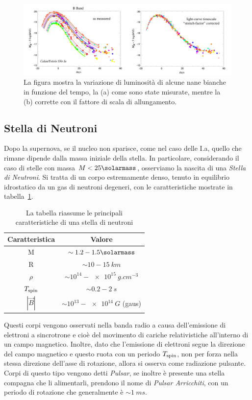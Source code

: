 \begin{figure}
    \centering
    \includegraphics[width = \textwidth]{immagini/stretch_hammuy.png}
    \caption{La figura mostra la variazione di luminosità di alcune nane bianche in funzione del tempo, la (a) come sono state misurate, mentre la (b) corrette con il fattore di scala di allungamento.}\label{fig:std-candle}
\end{figure}

\subsection{Stella di Neutroni}\label{sec:stella-neutroni}
Dopo la supernova, se il nucleo non sparisce, come nel caso delle I.a, quello che rimane dipende dalla massa iniziale della stella. In particolare, considerando il caso di stelle con massa $M < 25\si{\solarmass}$, osserviamo la nascita di una \textit{Stella di Neutroni}. Si tratta di un corpo estremamente denso, tenuto in equilibrio idrostatico da un gas di neutroni degeneri, con le caratteristiche mostrate in tabella~\ref{tab:neutron-star}.
\begin{table}
    \centering
    \caption{La tabella riassume le principali caratteristiche di una stella di neutroni}\label{tab:neutron-star}
    \begin{tabular}{c|c}
        \toprule
        Caratteristica & Valore\\
        \midrule
        M&$\sim 1.2 - 1.5 \si{\solarmass}$ \\
        R&$\sim 10 - \SI{15}{km}$ \\
        $\rho$&$\sim 10^{14} - \SI{e15}{g.cm^{-3}}$ \\
        $T_{\mbox{\scriptsize{spin}}}$& $\sim 0.2 - \SI{2}{s}$ \\
        $|\vec{B}|$& $\sim 10^{13} - \SI{e14}{G}$ (gaus)\\
        \bottomrule
    \end{tabular}
\end{table}

Questi corpi vengono osservati nella banda radio a causa dell'emissione di elettroni a sincrotrone e cioè del movimento di cariche relativistiche all'interno di un campo magnetico. Inoltre, dato che l'emissione di elettroni segue la direzione del campo magnetico e questo ruota con un periodo $T_{\mbox{\scriptsize{spin}}}$, non per forza nella stessa direzione dell'asse di rotazione, allora si osserva come radiazione pulsante. Corpi di questo tipo vengono detti \textit{Pulsar}, se inoltre è presente una stella compagna che li alimentarli, prendono il nome di \textit{Pulsar Arricchiti}, con un periodo di rotazione che generalmente è $\sim \SI{1}{ms}$.

